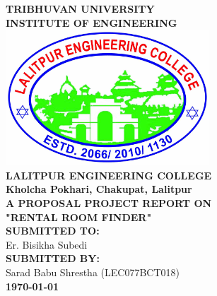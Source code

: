 {
	\thispagestyle{empty}
	\centering
   \fontsize{14pt}{14pt}\selectfont
        	\textbf{\MakeUppercase{Tribhuvan University}}\\
        	\textbf{\MakeUppercase{INSTITUTE OF ENGINEERING}}\\[0.5cm]
        	\includegraphics[width=3in]{lec2.jpg}\\[0.3cm]
        	\textbf{\MakeUppercase{Lalitpur Engineering College}}\\
    	\textbf{Kholcha Pokhari, Chakupat, Lalitpur}\\[1.4cm]
    	
    	\textbf{\MakeUppercase{A proposal project report on}}\\
    	\textbf{"\MakeUppercase{RENTAL ROOM FINDER}"}\\[2cm]
    
    	
    	\textbf{\MakeUppercase{Submitted To:}}\\
    	{Er. Bisikha Subedi}\\[1.2cm]
    	\textbf{\MakeUppercase{Submitted By:}}\\
            {
        	{{Sarad Babu Shrestha (LEC077BCT018)}}\\[1.1cm]
            }	
    	\textbf{\today}\\
}

